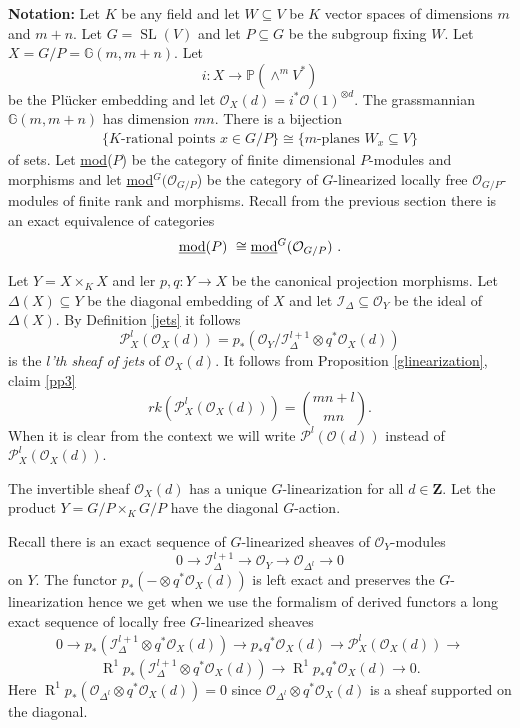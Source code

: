 \documentclass{amsart}
\theoremstyle{plain}
\theoremstyle{definition}
\theoremstyle{remark}
\numberwithin{equation}{theorem}
\begin{document}
\textbf{Notation:} Let $K$ be any field and let $W\subseteq V$ be
$K$ vector spaces of dimensions $m$ and $m+n$. Let $G={\operatorname{SL}}(V)$ and let
$P\subseteq G$ be the subgroup fixing $W$. Let $X=G/P={\mathbb{G} }(m,m+n)$. Let
\[ i:X\rightarrow {\mathbb{P}}(\wedge^m V^*) \]
be the Pl\"{u}cker embedding and let ${\mathcal{O} }_X(d)=i^*{\mathcal{O} }(1)^{\otimes
  d}$. The grassmannian ${\mathbb{G} }(m,m+n)$ has dimension $mn$.
There is a bijection
\begin{align} \{\text{$K$-rational points $x\in G/P$}\} \cong
  \{\text{$m$-planes $W_x\subseteq V$}\}
\end{align}
of sets.
Let {\underline{mod}($P$) }  be the category of finite dimensional $P$-modules and morphisms
and let {\underline{mod}$^G({\mathcal{O} }_{G/P}$) } be the category of $G$-linearized locally free ${\mathcal{O} }_{G/P}$-modules
of finite rank and morphisms.
Recall from the previous section there is an exact equivalence of categories
\begin{align} \label{equivalence} \text{\underline{mod}($P$) } \cong \text{\underline{mod}$^G({\mathcal{O} }_{G/P}$) }.
\end{align}

Let $Y=X\times_K X$ and ler $p,q:Y\rightarrow X$ be the
canonical projection morphisms. Let $\Delta(X)\subseteq Y$ be the
diagonal embedding of $X$ and let ${\mathcal{I}}_\Delta \subseteq {\mathcal{O} }_Y$ be the
ideal of $\Delta(X)$.
By Definition \ref{jets} it follows
\[ {\mathcal{P} }^l_X({\mathcal{O} }_X(d))=p_*({\mathcal{O} }_Y/{\mathcal{I}}_\Delta^{l+1}\otimes q^*{\mathcal{O} }_X(d)) \]
is the \emph{$l$'th sheaf of jets } of ${\mathcal{O} }_X(d)$.
It follows from Proposition \ref{glinearization}, claim \ref{pp3}
\[ rk({\mathcal{P} }^l_X({\mathcal{O} }_X(d))) =\binom{mn+l}{mn}.\]
When it is clear from the context we will write ${\mathcal{P} }^l({\mathcal{O} }(d))$ instead
of ${\mathcal{P} }^l_X({\mathcal{O} }_X(d))$.

The invertible sheaf ${\mathcal{O} }_{X}(d)$ has a unique $G$-linearization for
all $d\in \mathbf{Z}$. Let the product $Y=G/P\times_K G/P$ have
the diagonal $G$-action. 

Recall there is an exact sequence of $G$-linearized
sheaves of ${\mathcal{O} }_Y$-modules
\[ 0 \rightarrow {\mathcal{I}}_\Delta^{l+1}\rightarrow {\mathcal{O} }_Y \rightarrow {\mathcal{O} }_{\Delta^l}
\rightarrow 0 \]
on $Y$. The functor $p_*(-\otimes q^*{\mathcal{O} }_X(d)) $ is left exact and
preserves the $G$-linearization hence we get when we use the formalism
of derived functors a long exact sequence of locally free $G$-linearized sheaves
\begin{align} \label{ex1}0\rightarrow p_*({\mathcal{I}}_\Delta^{l+1}\otimes q^*{\mathcal{O} }_X(d))\rightarrow p_*q^*{\mathcal{O} }_X(d)
\rightarrow {\mathcal{P} }^l_X({\mathcal{O} }_X(d)) \rightarrow \end{align}
\[ {\operatorname{R} }^1p_*({\mathcal{I}}_\Delta^{l+1}\otimes q^*{\mathcal{O} }_X(d))\rightarrow
{\operatorname{R} }^1p_*q^*{\mathcal{O} }_X(d)\rightarrow  0 .\]
Here  ${\operatorname{R} }^1p_*({\mathcal{O} }_{\Delta^l}\otimes q^*{\mathcal{O} }_X(d))=0$ since
${\mathcal{O} }_{\Delta^l}\otimes q^*{\mathcal{O} }_X(d)$ is a sheaf supported on the diagonal.
\end{document}
